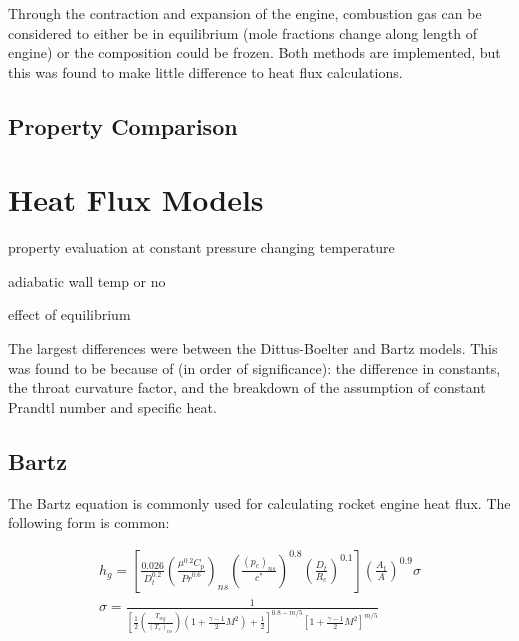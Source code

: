 \documentclass[11pt]{article}
\begin{document}
Through the contraction and expansion of the engine, combustion gas can be considered to either be in equilibrium (mole fractions change along length of engine) or the composition could be frozen. Both methods are implemented, but this was found to make little difference to heat flux calculations.


\subsection{Property Comparison}

\section{Heat Flux Models}

property evaluation at constant pressure changing temperature

adiabatic wall temp or no

effect of equilibrium

The largest differences were between the Dittus-Boelter and Bartz models. This was found to be because of (in order of significance): the difference in constants, the throat curvature factor, and the breakdown of the assumption of constant Prandtl number and specific heat.

\subsection{Bartz}


The Bartz equation is commonly used for calculating rocket engine heat flux. The following form is common:

\begin{equation}
    \label{equation:bartz}
    \begin{split}
         h_g = \left[ \frac{0.026}{D_t^{0.2}} \left( \frac{\mu^{0.2} C_p}{{Pr}^{0.6}} \right)_{ns} \left( \frac{(p_c)_{ns}}{c^*} \right)^{0.8} \left( \frac{D_t}{R_c} \right)^{0.1} \right] \left( \frac{A_t}{A} \right)^{0.9} \sigma \\
         \sigma = \frac{1}{\left[ \frac{1}{2} \left( \frac{T_{wg}}{(T_c)_{ns}} \right) \left( 1 + \frac{\gamma - 1}{2} M^2 \right) + \frac{1}{2}\right]^{0.8-m/5} \left[ 1 + \frac{\gamma - 1}{2} M^2 \right]^{m/5}}
    \end{split}
\end{equation}
\end{document}
